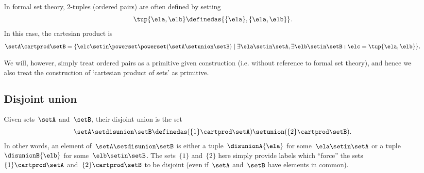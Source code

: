 \begin{remark}
In formal set theory, 2-tuples (ordered pairs) are often defined by setting
\begin{equation}
    \label{eq:ordered-pair}
    \tup{\ela, \elb} \definedas \{ \{\ela \} , \{ \ela, \elb \} \}.
\end{equation}
In this case, the cartesian product is
\begin{equation}
    \setA \cartprod \setB = \{ \elc \setin\powerset \powerset (\setA \setunion \setB) \mid \exists \ela \setin\setA, \exists \elb \setin\setB : \elc = \tup{\ela, \elb} \}.
\end{equation}

We will, however, simply treat ordered pairs as a primitive given construction (i.e. without reference to formal set theory), and hence we also treat the construction of `cartesian product of sets' as primitive.
\end{remark}


\subsection{Disjoint union}
\label{sec:disjoint-union}

Given sets~$\setA$ and~$\setB$, their disjoint union is the set
\begin{equation*}
    \setA \setdisunion \setB \definedas (  \{ 1 \} \cartprod \setA) \setunion ( \{2\}  \cartprod \setB).
\end{equation*}
In other words, an element of~$\setA \setdisunion \setB$ is either a tuple~$\disunionA{\ela}$ for some~$\ela \setin\setA$ or a tuple $\disunionB{\elb}$ for some~$\elb \setin\setB$.
The sets~$\{ 1 \}$ and~$\{2\}$ here simply provide labels which ``force'' the sets~$\{ 1 \}  \cartprod \setA$ and~$ \{2\}  \cartprod \setB$ to be disjoint (even if~$\setA$ and~$\setB$ have elements in common).



